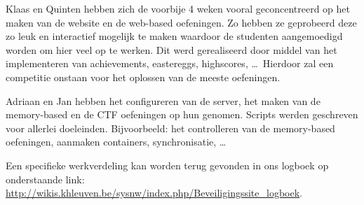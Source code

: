 Klaas en Quinten hebben zich de voorbije 4 weken vooral geconcentreerd op het maken van de website en de web-based oefeningen. Zo hebben ze geprobeerd deze zo leuk en interactief mogelijk te maken waardoor de studenten aangemoedigd worden om hier veel op te werken. Dit werd gerealiseerd door middel van het implementeren van achievements, eastereggs, highscores, \ldots ~Hierdoor zal een competitie onstaan voor het oplossen van de meeste oefeningen.

Adriaan en Jan hebben het configureren van de server, het maken van de memory-based\cite{taoe} en de CTF oefeningen op hun genomen. Scripts werden geschreven voor allerlei doeleinden. Bijvoorbeeld: het controlleren van de memory-based oefeningen, aanmaken containers, synchronisatie, \ldots

Een specifieke werkverdeling kan worden terug gevonden in ons logboek op onderstaande link:
\url{http://wikis.khleuven.be/sysnw/index.php/Beveiligingssite_logboek}.